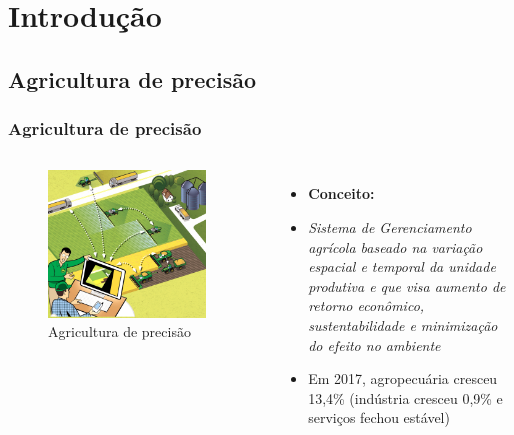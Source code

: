 \section{Introdução} %

\subsection{Agricultura de precisão}

\begin{frame}
\frametitle{Agricultura de precisão}
\begin{columns}

	\begin{figure}[]
	 \centering
	 \captionsetup{width=0.9\textwidth,font=footnotesize,textfont=bf}
	 \includegraphics[width=0.9\textwidth,keepaspectratio]{Figuras/precisao.jpg}
	 \caption{Agricultura de precisão}
	\end{figure}
	
	\begin{itemize}
	\item \textbf{Conceito:}
	\item \textit{Sistema de Gerenciamento agrícola baseado na variação espacial e temporal da unidade produtiva e que visa aumento de retorno econômico, sustentabilidade e minimização do efeito no ambiente}
	\pause
	\item Em 2017, agropecuária cresceu 13,4\% (indústria cresceu 0,9\% e serviços fechou estável)
	\end{itemize}

\end{columns}
\end{frame}

